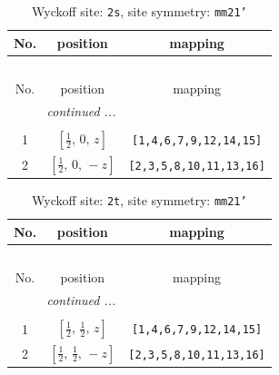\documentclass[fleqn,8pt]{jsarticle}
\begin{document}
\begin{longtable}{ccc}
\caption{Wyckoff site: {\tt 2s}, site symmetry: {\tt mm21'}}
 \\
 \hline \hline
No. & position & mapping \\ \hline \endfirsthead

\multicolumn{2}{l}{\tablename\ \thetable{}} \\
 \hline \hline
No. & position & mapping \\ \hline \endhead

 \hline \hline
\multicolumn{2}{r}{\footnotesize\it continued ...} \\ \endfoot

 \hline \hline
\multicolumn{2}{r}{} \\ \endlastfoot

1 & $\left[ \frac{1}{2},\, 0,\, z \right]$ & {\tt [1,4,6,7,9,12,14,15]} \\ \hline
2 & $\left[ \frac{1}{2},\, 0,\, - z \right]$ & {\tt [2,3,5,8,10,11,13,16]} \\
\end{longtable}
\renewcommand{\arraystretch}{1.2}
\begin{longtable}{ccc}
\caption{Wyckoff site: {\tt 2t}, site symmetry: {\tt mm21'}}
 \\
 \hline \hline
No. & position & mapping \\ \hline \endfirsthead

\multicolumn{2}{l}{\tablename\ \thetable{}} \\
 \hline \hline
No. & position & mapping \\ \hline \endhead

 \hline \hline
\multicolumn{2}{r}{\footnotesize\it continued ...} \\ \endfoot

 \hline \hline
\multicolumn{2}{r}{} \\ \endlastfoot

1 & $\left[ \frac{1}{2},\, \frac{1}{2},\, z \right]$ & {\tt [1,4,6,7,9,12,14,15]} \\ \hline
2 & $\left[ \frac{1}{2},\, \frac{1}{2},\, - z \right]$ & {\tt [2,3,5,8,10,11,13,16]} \\
\end{longtable}
\renewcommand{\arraystretch}{1.2}
\end{document}
